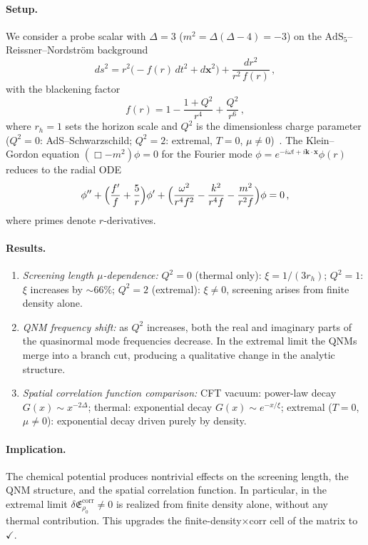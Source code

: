 \documentclass[
  aps,
  prd,
  preprint,
  groupedaddress,
  nofootinbib,
  longbibliography
]{revtex4-2}
\theoremstyle{remark}
\newcommand{\AdS}{\mathrm{AdS}}
\begin{document}
\paragraph{Setup.}
We consider a probe scalar with $\Delta=3$
($m^2=\Delta(\Delta-4)=-3$) on the
$\AdS_5$--Reissner--Nordstr\"om background
\begin{equation}\label{eq:AdS-RN-metric}
  ds^2 = r^2\bigl(-f(r)\,dt^2 + d\mathbf{x}^2\bigr)
       + \frac{dr^2}{r^2\,f(r)}\,,
\end{equation}
with the blackening factor
\begin{equation}\label{eq:AdS-RN-blackening}
  f(r)=1-\frac{1+Q^2}{r^4}+\frac{Q^2}{r^6}\,,
\end{equation}
where $r_h=1$ sets the horizon scale and $Q^2$ is the
dimensionless charge parameter
($Q^2=0$: AdS--Schwarzschild;
$Q^2=2$: extremal, $T=0$, $\mu\neq 0$)~\cite{ref42}.
The Klein--Gordon equation
$(\Box-m^2)\phi=0$ for the Fourier mode
$\phi=e^{-i\omega t+i\mathbf{k}\cdot\mathbf{x}}\phi(r)$
reduces to the radial ODE
\begin{equation}\label{eq:scalar-fluct}
  \phi''+\Bigl(\frac{f'}{f}+\frac{5}{r}\Bigr)\phi'
  +\Bigl(\frac{\omega^2}{r^4 f^2}
        -\frac{k^2}{r^4 f}
        -\frac{m^2}{r^2 f}\Bigr)\phi = 0\,,
\end{equation}
where primes denote $r$-derivatives.

\paragraph{Results.}
\begin{enumerate}
\item \emph{Screening length $\mu$-dependence:}
  $Q^2=0$ (thermal only): $\xi=1/(3r_h)$;
  $Q^2=1$: $\xi$ increases by $\sim 66\%$;
  $Q^2=2$ (extremal): $\xi\neq 0$, screening arises from
  finite density alone.
\item \emph{QNM frequency shift:}
  as $Q^2$ increases, both the real and imaginary parts of the
  quasinormal mode frequencies decrease.
  In the extremal limit the QNMs merge into a branch cut,
  producing a qualitative change in the analytic structure.
\item \emph{Spatial correlation function comparison:}
  CFT vacuum: power-law decay $G(x)\sim x^{-2\Delta}$;
  thermal: exponential decay $G(x)\sim e^{-x/\xi}$;
  extremal ($T=0$, $\mu\neq 0$): exponential decay driven
  purely by density.
\end{enumerate}

\paragraph{Implication.}
The chemical potential produces nontrivial effects on the
screening length, the QNM structure, and the spatial correlation
function.
In particular, in the extremal limit
$\delta\mathfrak{E}_{\rho_0}^{\mathrm{corr}}\neq 0$ is realized
from finite density alone, without any thermal contribution.
This upgrades the finite-density$\times$corr cell of the matrix
to~$\checkmark$.
\end{document}
